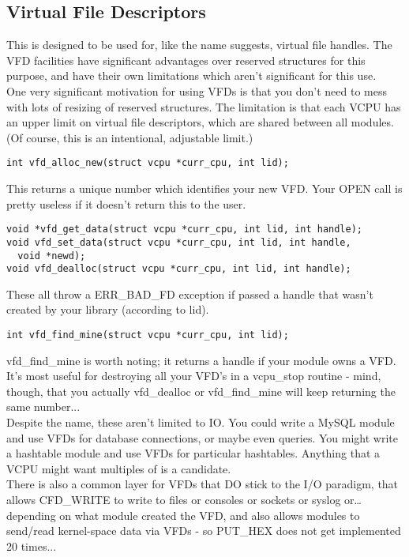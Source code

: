 \documentclass[a4paper,oneside,openany]{book}
\begin{document}
\subsection{Virtual File Descriptors}
This is designed to be used for, like the name suggests, virtual file handles.
The VFD facilities have significant advantages over reserved structures for
this purpose, and have their own limitations which aren't significant for this
use.
\smallskip\\
One very significant motivation for using VFDs is that you don't need to mess
with lots of resizing of reserved structures. The limitation is that each VCPU
has an upper limit on virtual file descriptors, which are shared between all
modules. (Of course, this is an intentional, adjustable limit.)
\begin{verbatim}
int vfd_alloc_new(struct vcpu *curr_cpu, int lid);
\end{verbatim}
This returns a unique number which identifies your new VFD. Your OPEN call is
pretty useless if it doesn't return this to the user.
\begin{verbatim}
void *vfd_get_data(struct vcpu *curr_cpu, int lid, int handle);
void vfd_set_data(struct vcpu *curr_cpu, int lid, int handle,
  void *newd);
void vfd_dealloc(struct vcpu *curr_cpu, int lid, int handle);
\end{verbatim}
These all throw a ERR\_BAD\_FD exception if passed a handle that wasn't created
by your library (according to lid).
\begin{verbatim}
int vfd_find_mine(struct vcpu *curr_cpu, int lid);
\end{verbatim}
vfd\_find\_mine is worth noting; it returns a handle if your module owns a VFD.
It's most useful for destroying all your VFD's in a vcpu\_stop routine - mind,
though, that you actually vfd\_dealloc or vfd\_find\_mine will keep returning the
same number...
\smallskip\\
Despite the name, these aren't limited to IO. You could write a MySQL module and
use VFDs for database connections, or maybe even queries. You might write a
hashtable module and use VFDs for particular hashtables. Anything that a VCPU might
want multiples of is a candidate.
\smallskip\\
There is also a common layer for VFDs that DO stick to the I/O paradigm, that
allows CFD\_WRITE to write to files or consoles or sockets or syslog or\ldots
depending on what module created the VFD, and also allows modules to send/read
kernel-space data via VFDs - so PUT\_HEX does not get implemented 20 times...
\end{document}
